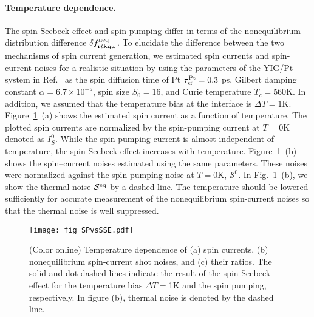 \documentclass[aps,prl,reprint,showpacs]{revtex4-1}
\def\v#1{\mathbf{#1}}
\def\r{\v{r}} 					%
\def\q{\v{q}} 					%
\def\k{\v{k}} 					%
\def\tsf{\tau_{\rm sf}}
\begin{document}
\paragraph{Temperature dependence.---}
The spin Seebeck effect and spin pumping differ in terms of the nonequilibrium distribution difference $\delta f^{{\rm neq}}_{\r t\k\q\omega}$.
To elucidate the difference between the two mechanisms of spin current generation, we estimated spin currents and spin-current noises for a realistic situation by using the parameters of the YIG/Pt system in Ref.~ as the spin diffusion time of Pt $\tsf^{\rm Pt} = 0.3$ ps, Gilbert damping constant $\alpha = 6.7\times10^{-5}$, spin size $S_0=16$, and Curie temperature $T_c = 560$K. 
In addition, we assumed that the temperature bias at the interface is $\Delta T =1$K. 
Figure~\ref{fig_SPvsSSE}~(a) shows the estimated spin current as a function of temperature.
The plotted spin currents are normalized by the spin-pumping current at $T=0$K denoted as $I_S^0$. 
%
While the spin pumping current is almost independent of temperature, 
the spin Seebeck effect increases with temperature.
Figure~\ref{fig_SPvsSSE}~(b) shows the spin--current noises estimated using the same parameters. 
These noises were normalized against the spin pumping noise at $T=0$K, $\mathcal{S}^0$.  
In Fig.~\ref{fig_SPvsSSE}~(b), we show the thermal noise $\mathcal{S}^{\rm eq}$ 
by a dashed line. The temperature should be lowered sufficiently 
for accurate measurement of the nonequilibrium spin-current noises so that
the thermal noise is well suppressed.

\begin{figure}[!hbtp]
	\begin{center}
   \texttt{[image: fig\_SPvsSSE.pdf]}
	\caption{(Color online) Temperature dependence of (a) spin currents, 
    (b) nonequilibrium spin-current shot noises, and 
    (c) their ratios. The solid and dot-dashed lines indicate 
    the result of the spin Seebeck effect for the temperature bias $\Delta T=$1K 
    and the spin pumping, respectively. 
    In figure (b), thermal noise is denoted by the dashed line.
    }\label{fig_SPvsSSE}
	\end{center}
\end{figure}
\end{document}
